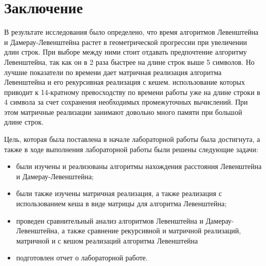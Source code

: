 \chapter*{Заключение}

В результате исследования было определено, что время алгоритмов Левенштейна и Дамерау-Левенштейна растет в геометрической прогрессии при увеличении длин строк. При выборе между ними стоит отдавать предпочтение алгоритму Левенштейна, так как он в 2 раза быстрее на длине строк выше 5 символов. Но лучшие показатели по времени дает матричная реализация алгоритма Левенштейна и его рекурсивная реализация с кешем. использование которых приводит к 14-кратному превосходству по времени работы уже на длине строки в 4 символа за счет сохранения необходимых промежуточных вычислений. При этом матричные реализации занимают довольно много памяти при большой длине строк.


Цель, которая была поставлена в начале лабораторной работы была достигнута, а также в ходе выполнения лабораторной работы были решены следующие задачи:

\begin{itemize}
	\item были изучены и реализованы алгоритмы нахождения расстояния Левенштейна и Дамерау-Левенштейна;
	\item были также изучены матричная реализация, а также реализация с использованием кеша в виде матрицы для алгоритма Левенштейна;
    \item проведен сравнительный анализ алгоритмов Левенштейна и Дамерау-Левенштейна, а также сравнение рекурсивной и матричной реализаций, матричной и с кешом реализаций алгоритма Левенштейна
	\item подготовлен отчет о лабораторной работе.
\end{itemize}